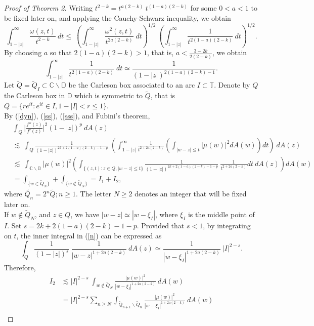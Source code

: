\documentclass[12pt,a4paper]{article}
\theoremstyle{definition}
\theoremstyle{remark}
\newcommand{\C}{\mathbb{C}}
\newcommand{\D}{\mathbb{D}}
\newcommand{\T}{\mathbb{T}}
\numberwithin{komcounter}{section}
\begin{document}
\begin{proof}[Proof of Theorem 2]
Writing $t^{2-k}=t^{a(2-k)}~t^{(1-a)(2-k)}$ for some $0<a<1$ to be fixed later on, and applying the Cauchy-Schwarz inequality, we obtain	
\begin{equation}\label{ss}
\int_{1-|z|}^{\infty}
\frac{\omega(z,t)}{t^{2-k}}~ dt \leq ~ \left(\int_{1-|z|}^{\infty}
\frac{\omega^2(z,t)}{t^{2a(2-k)}}~ dt\right)^{1/2} ~	\left(\int_{1-|z|}^{\infty}
\frac{1}{t^{2(1-a)(2-k)}}~ dt\right)^{1/2}.
\end{equation}	
By choosing $a$ so that $2(1-a)(2-k)>1$, that is, $	a<\frac{3-2k}{2(2-k)}$, we obtain
\begin{equation}\label{sss}
\int_{1-|z|}^{\infty}\frac{1}{t^{2(1-a)(2-k)}}~ dt \simeq  \frac{1}{(1-|z|)^{2(1-a)(2-k)-1}}.
\end{equation}
Let $\tilde{Q}= \tilde{Q}_I \subset\C\backslash \D $ be the Carleson box associated to an arc $I\subset \T$. Denote by $Q$ the Carleson box in $\D$ which is symmetric to $\tilde{Q}$, that is  $Q=  \{r e^{it}: e^{it}\in I, 1-|I| < r \leq 1\}$.\\
By (\ref{dyn}), (\ref{ss}), (\ref{sss}), and Fubini's theorem,
\begin{align}
&\int_{Q} \bigg\vert\frac{f''(z)}{f'(z)}\bigg\vert^2 (1-|z|)^p ~dA(z)\nonumber\\&\lesssim~ \int_{Q}\frac{1}{(1-|z|)^{2k+2(1-a)(2-k)-1-p}}~	 \left(\int_{1-|z|}^{\infty}
\frac{1}{t^{2+2a(2-k)}}\left( \int_{|w-z|\leq t} |\mu(w)|^2dA(w)\right) dt\right) ~dA(z) \nonumber\\
&\lesssim ~\int_{\C\backslash \D} |\mu(w)|^2\left(\int_{ \{(z,t):z\in Q, |w-z|\leq t\} }\frac{1}{(1-|z|)^{2k+2(1-a)(2-k)-1-p}}~             \frac{1}{t^{2+2a(2-k)}}dt~ dA(z)\right)dA(w)\label{n}\\ 
&=\int_{\{w\in  \tilde Q_N\}}+ \int_{\{w\notin \tilde Q_N \}}=I_1+I_2,\label{nn}
\end{align}
where     $\tilde{Q_n}= 2^n \tilde{Q}; n\geq 1 $. The letter $ N\geq 2$ denotes an integer that will be fixed later on.\\
\indent
If $w\notin \tilde{Q}_N$, and $z\in Q$, we have $|w-z|\simeq |w-\xi_I|$, where $\xi_I$ is the middle point of $I$. Set $s= 2k+2(1-a)(2-k)-1-p$. Provided that $s<1$, by integrating on $t$, the inner integral in (\ref{n}) can be expressed as
$$
\int_ {Q}\frac{1}{(1-|z|)^s}~ \frac{1}{|w-z|^{1+2a(2-k)}}~ dA(z)\simeq  \frac{1}{|w-\xi_I|^{1+2a(2-k)}} ~|I|^{2-s}.
$$
Therefore, 
\begin{align}
I_2&\lesssim |I|^{2-s}~\int_{w\notin \tilde{Q}_N} \frac{|\mu(w)|^2}{|w-\xi_I|^{1+2a(2-k)}}~dA(w)\nonumber\\&= |I|^{2-s}\sum_{n\geq N} \int_{\tilde{Q}_{n+1}\backslash \tilde{Q}_{n}} \frac{|\mu(w)|^2}{|w-\xi_I|^{1+2a(2-k)}}~dA(w)\nonumber\\

\end{align}
\end{proof}
\end{document}
